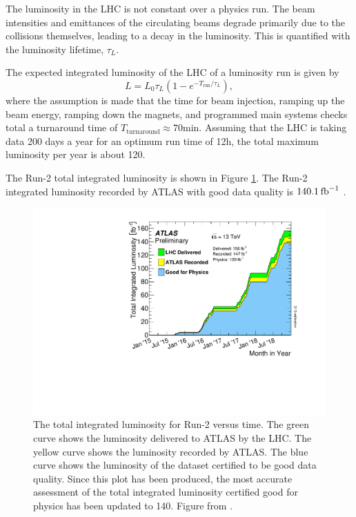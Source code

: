 The luminosity in the LHC is not constant over a physics run. The beam intensities and emittances of the circulating beams degrade primarily due to the collisions themselves, leading to a decay in the luminosity. This is quantified with the luminosity lifetime, $\tau_L$. 

The expected integrated luminosity of the LHC of a luminosity run is given by
\begin{equation}
    L=L_0\tau_L(1-e^{-T_{\text{run}}/\tau_L}),
\end{equation}
where the assumption is made that the time for beam injection, ramping up the beam energy, ramping down the magnets, and programmed main systems checks total a turnaround time of $T_{\text{turnaround}}\approx 70\text{min}$. Assuming that the LHC is taking data 200 days a year for an optimum run time of 12h, the total maximum luminosity per year is about 120\invfb \cite{LHC:design}.

The Run-2 total integrated luminosity is shown in Figure \ref{fig:LHC:intlumi}. The Run-2 integrated luminosity recorded by ATLAS with good data quality is $140.1\hspace{2pt}\text{fb}^{-1}$ \cite{LHC:atlaslumi}.

\begin{figure}[t]
    \centering
    \includegraphics[width=\textwidth]{plots/lhc/intlumivstimeRun2DQall.pdf}
    \caption{The total integrated luminosity for Run-2 versus time. The green curve shows the luminosity delivered to ATLAS by the LHC. The yellow curve shows the luminosity recorded by ATLAS. The blue curve shows the luminosity of the dataset certified to be good data quality. Since this plot has been produced, the most accurate assessment of the total integrated luminosity certified good for physics has been updated to 140\infb \cite{LHC:atlaslumi}. Figure from \cite{LHC:deliveredlumi}.\label{fig:LHC:intlumi}}
\end{figure}

